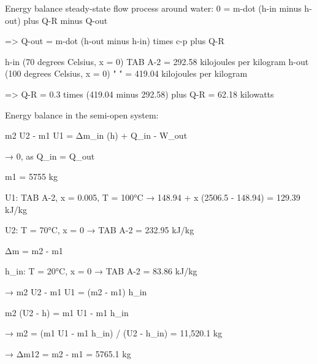 Energy balance steady-state flow process around water:  
0 = m-dot (h-in minus h-out) plus Q-R minus Q-out  

=> Q-out = m-dot (h-out minus h-in) times c-p plus Q-R  

h-in (70 degrees Celsius, x = 0) TAB A-2 = 292.58 kilojoules per kilogram  
h-out (100 degrees Celsius, x = 0) " " = 419.04 kilojoules per kilogram  

=> Q-R = 0.3 times (419.04 minus 292.58) plus Q-R  
= 62.18 kilowatts

Energy balance in the semi-open system:  

m2 U2 - m1 U1 = Δm_in (h) + Q_in - W_out  

→ 0, as Q_in = Q_out  

m1 = 5755 kg  

U1: TAB A-2, x = 0.005, T = 100°C  
→ 148.94 + x (2506.5 - 148.94) = 129.39 kJ/kg  

U2: T = 70°C, x = 0  
→ TAB A-2 = 232.95 kJ/kg  

Δm = m2 - m1  

h_in: T = 20°C, x = 0  
→ TAB A-2 = 83.86 kJ/kg  

→ m2 U2 - m1 U1 = (m2 - m1) h_in  

m2 (U2 - h) = m1 U1 - m1 h_in  

→ m2 = (m1 U1 - m1 h_in) / (U2 - h_in) = 11,520.1 kg  

→ Δm12 = m2 - m1 = 5765.1 kg
